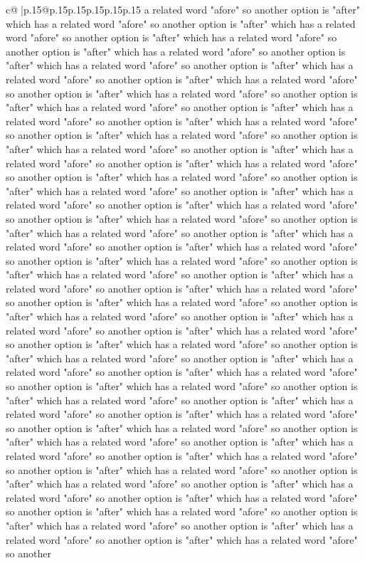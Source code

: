 \documentclass{article}
\begin{document}
{\begin{supertabular}{c@{$\;$}|p{.15\linewidth}@{}p{.15\linewidth}p{.15\linewidth}p{.15\linewidth}p{.15\linewidth}p{.15\linewidth}}
{{{a related word "afore" so another option is "after" which has a related word "afore" so another option is "after" which has a related word "afore" so another option is "after" which has a related word "afore" so another option is "after" which has a related word "afore" so another option is "after" which has a related word "afore" so another option is "after" which has a related word "afore" so another option is "after" which has a related word "afore" so another option is "after" which has a related word "afore" so another option is "after" which has a related word "afore" so another option is "after" which has a related word "afore" so another option is "after" which has a related word "afore" so another option is "after" which has a related word "afore" so another option is "after" which has a related word "afore" so another option is "after" which has a related word "afore" so another option is "after" which has a related word "afore" so another option is "after" which has a related word "afore" so another option is "after" which has a related word "afore" so another option is "after" which has a related word "afore" so another option is "after" which has a related word "afore" so another option is "after" which has a related word "afore" so another option is "after" which has a related word "afore" so another option is "after" which has a related word "afore" so another option is "after" which has a related word "afore" so another option is "after" which has a related word "afore" so another option is "after" which has a related word "afore" so another option is "after" which has a related word "afore" so another option is "after" which has a related word "afore" so another option is "after" which has a related word "afore" so another option is "after" which has a related word "afore" so another option is "after" which has a related word "afore" so another option is "after" which has a related word "afore" so another option is "after" which has a related word "afore" so another option is "after" which has a related word "afore" so another option is "after" which has a related word "afore" so another option is "after" which has a related word "afore" so another option is "after" which has a related word "afore" so another option is "after" which has a related word "afore" so another option is "after" which has a related word "afore" so another option is "after" which has a related word "afore" so another option is "after" which has a related word "afore" so another option is "after" which has a related word "afore" so another option is "after" which has a related word "afore" so another option is "after" which has a related word "afore" so another option is "after" which has a related word "afore" so another option is "after" which has a related word "afore" so another option is "after" which has a related word "afore" so another option is "after" which has a related word "afore" so another option is "after" which has a related word "afore" so another option is "after" which has a related word "afore" so another option is "after" which has a related word "afore" so another option is "after" which has a related word "afore" so another }}}
\end{supertabular}}
\end{document}
